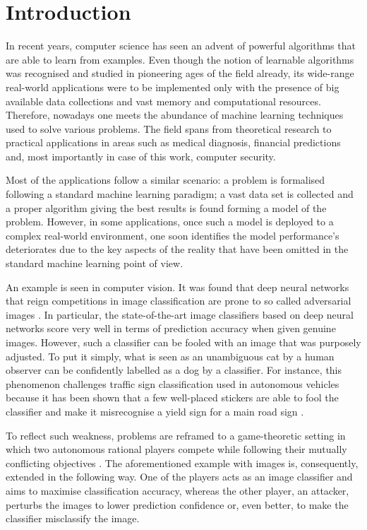 \section*{Introduction}

In recent years, computer science has seen an advent of powerful
algorithms that are able to learn from examples. Even though the notion of
learnable algorithms was recognised and studied in pioneering ages of
the field already, its wide-range real-world applications were to be
implemented only with the presence of big available data collections and
vast memory and computational resources. Therefore, nowadays one meets
the abundance of machine learning techniques used to solve various
problems. The field spans from theoretical research to practical
applications in areas such as medical diagnosis, financial predictions
and, most importantly in case of this work, computer security.

Most of the applications follow a similar scenario: a problem is
formalised following a standard machine learning paradigm; a vast data
set is collected and a proper algorithm giving the best results is found
forming a model of the problem. However, in some applications, once such
a model is deployed to a complex real-world environment, one soon
identifies the model performance's deteriorates due to the key aspects of
the reality that have been omitted in the standard machine learning
point of view.

An example is seen in computer vision. It was
found that deep neural networks that reign competitions in image
classification \cite{image_net} are prone to so called adversarial
images \cite{adversarial_examples}. In particular, the state-of-the-art image
classifiers based on deep neural networks score very well in terms of
prediction accuracy when given genuine images. However, such a
classifier can be fooled with an image that was purposely adjusted. To
put it simply, what is seen as an unambiguous cat by a human observer can
be confidently labelled as a dog by a classifier. For instance, this
phenomenon challenges traffic sign classification used in autonomous
vehicles because it has been shown that a few well-placed stickers are
able to fool the classifier and make it misrecognise a yield sign for a
main road sign \cite{adversarial_examples_2}.

To reflect such weakness, problems are reframed to a game-theoretic
setting in which two autonomous rational players compete while following
their mutually conflicting objectives \cite{towards_deep_learning_models, defense_gan, gan}. The aforementioned example with
images is, consequently, extended in the following way. One of the
players acts as an image classifier and aims to maximise classification
accuracy, whereas the other player, an attacker, perturbs the images to
lower prediction confidence or, even better, to make the classifier
misclassify the image.

